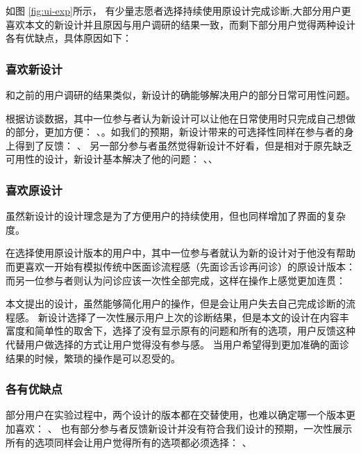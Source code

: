 如图 \ref{fig:ui-exp}所示， 有少量志愿者选择持续使用原设计完成诊断,大部分用户更喜欢本文的新设计并且原因与用户调研的结果一致，而剩下部分用户觉得两种设计各有优缺点，具体原因如下：


\subsubsection{喜欢新设计}

和之前的用户调研的结果类似，新设计的确能够解决用户的部分日常可用性问题。

根据访谈数据，其中一位参与者认为新设计可以让他在日常使用时只完成自己想做的部分，更加方便：
、。如我们的预期，新设计带来的可选择性同样在参与者的身上得到了反馈：
、
另一部分参与者虽然觉得新设计不好看，但是相对于原先缺乏可用性的设计，新设计基本解决了他的问题：
、、


\subsubsection{喜欢原设计}
虽然新设计的设计理念是为了方便用户的持续使用，但也同样增加了界面的复杂度。

在选择使用原设计版本的用户中，其中一位参与者就认为新的设计对于他没有帮助而更喜欢一开始有模拟传统中医面诊流程感（先面诊舌诊再问诊）的原设计版本：
而另一位参与者则认为问诊应该一次性全部完成，这样在操作上感觉更加连贯：

本文提出的设计，虽然能够简化用户的操作，但是会让用户失去自己完成诊断的流程感。
新设计选择了一次性展示用户上次的诊断结果，但是本文的设计在内容丰富度和简单性的取舍下，选择了没有显示原有的问题和所有的选项，用户反馈这种代替用户做选择的方式让用户觉得没有参与感。
当用户希望得到更加准确的面诊结果的时候，繁琐的操作是可以忍受的。

\subsubsection{各有优缺点}
部分用户在实验过程中，两个设计的版本都在交替使用，也难以确定哪一个版本更加喜欢：
、
也有部分参与者反馈新设计并没有符合我们设计的预期，一次性展示所有的选项同样会让用户觉得所有的选项都必须选择：
、

